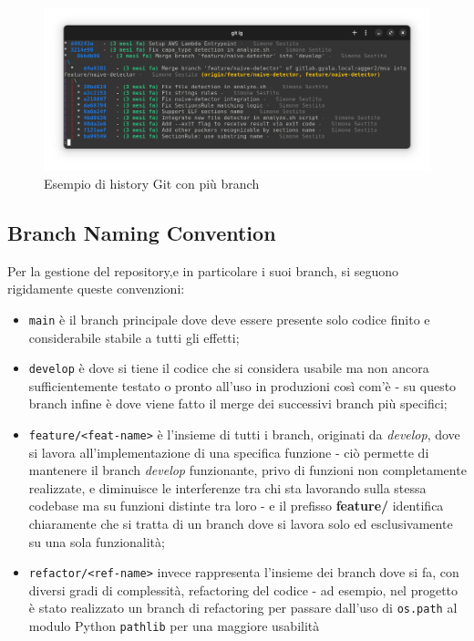 \begin{figure}[htbp]
    \centering
    \includegraphics[width=\textwidth]{assets/git_log_history.png}
    \caption{Esempio di history Git con più branch}
    \label{fig:git_log_history}
\end{figure}

\subsection{Branch Naming Convention}
\label{chap:git_branch_naming_convention}
Per la gestione del repository,e in particolare i suoi branch, si seguono rigidamente queste convenzioni:
\begin{itemize}
    \item \texttt{main} è il branch principale dove deve essere presente solo codice finito e considerabile stabile a tutti gli effetti;
    \item \texttt{develop} è dove si tiene il codice che si considera usabile ma non ancora sufficientemente testato o pronto all'uso in produzioni così com'è - su questo branch infine è dove viene fatto il merge dei successivi branch più specifici;
    \item \texttt{feature/<feat-name>} è l'insieme di tutti i branch, originati da \emph{develop}, dove si lavora all'implementazione di una specifica funzione - ciò permette di mantenere il branch \emph{develop} funzionante, privo di funzioni non completamente realizzate, e diminuisce le interferenze tra chi sta lavorando sulla stessa codebase ma su funzioni distinte tra loro - e il prefisso \textbf{feature/} identifica chiaramente che si tratta di un branch dove si lavora solo ed esclusivamente su una sola funzionalità;
    \item \texttt{refactor/<ref-name>} invece rappresenta l'insieme dei branch dove si fa, con diversi gradi di complessità, refactoring del codice - ad esempio, nel progetto è stato realizzato un branch di refactoring per passare dall'uso di \texttt{os.path} al modulo Python \texttt{pathlib} per una maggiore usabilità
\end{itemize}

